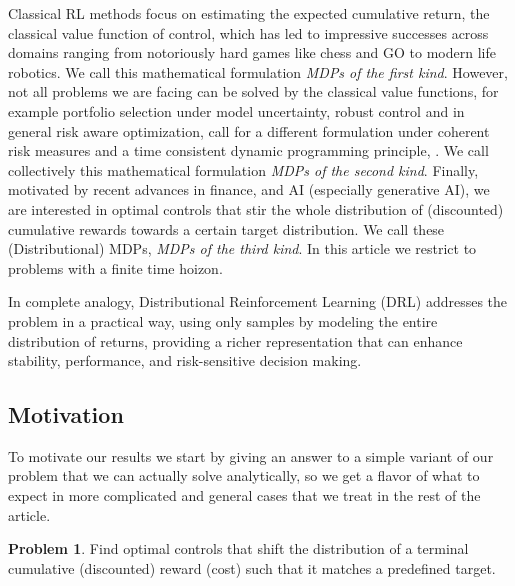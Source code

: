 \documentclass[reqno, 11pt]{amsart}%
\theoremstyle{definition}
\newtheorem{prob}[theorem]{Problem}
\begin{document}
 Classical RL methods focus on estimating the expected cumulative return, the classical value function of control, which has led to impressive successes across domains ranging from notoriously hard games like chess and GO to modern life robotics. We call this mathematical formulation \emph{MDPs of the first kind}. However, not all problems we are facing can be solved by the classical value functions, for example portfolio selection under model uncertainty, robust control and in general risk aware optimization, \cite{ContModelUncertainty,bauerleglaunerDistributionallyRobustMDPs,PrashanthFu2022RiskSensitiveRL,CoacheJaimungalRLconvexriskmeasures,coache2025robustreinforcementlearningdynamic,BauerleJaskiewiczMDPRiskSensitiveOverview,Guin_2026} call for a different formulation under coherent risk measures and a time consistent dynamic programming principle, \cite{ArtznerCoherentMeasuresofRist}. We call collectively this mathematical formulation \emph{MDPs of the second kind}. Finally, motivated by recent advances in finance, \cite{LassanceVrins2023TargetDistribution, ColaneriEisenbergSalterini2023TerminalDist}  and AI (especially generative AI), we are interested in optimal controls that stir the whole distribution of (discounted) cumulative rewards towards a certain target distribution. %
 We call these (Distributional) MDPs,  \emph{MDPs of the third kind}. In this article we restrict to problems with a finite time hoizon.
 
 In complete analogy, Distributional Reinforcement Learning (DRL) addresses the problem in a practical way, using only samples by modeling the entire distribution of returns, providing a richer representation that can enhance stability, performance, and risk-sensitive decision making. 

\subsection{Motivation}
\label{se:motivation}
To motivate our results we start by giving an answer to a simple variant of our problem that we can actually solve analytically, so we get a flavor of what to expect in more complicated and general cases that we treat in the rest of the article. 

\begin{prob}
\label{prob:informal}
	Find optimal controls that shift the distribution of a terminal cumulative (discounted) reward (cost) such that it matches a predefined target. 
\end{prob}
\end{document}
